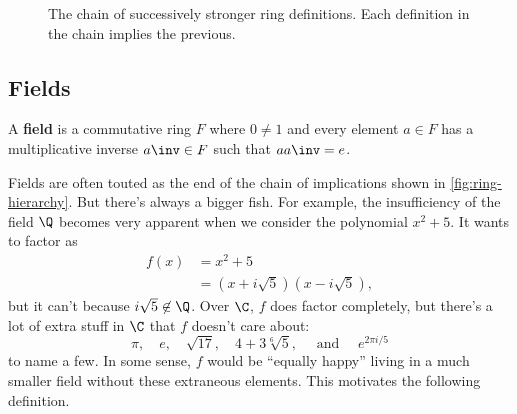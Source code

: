 \begin{figure}
    \centering
    \caption{The chain of successively stronger ring definitions. Each definition in the chain implies the previous.}
    \label{fig:ring-hierarchy}
\end{figure}

\subsection{Fields}

\begin{definition}[Field]
    A \textbf{field} is a commutative ring $F$ where $0 \neq 1$ and every element $a \in F$ has a multiplicative inverse $a \inv \in F$ such that $a a \inv = e$.
\end{definition}

Fields are often touted as the end of the chain of implications shown in \autoref{fig:ring-hierarchy}. But there's always a bigger fish. For example, the insufficiency of the field $\Q$ becomes very apparent when we consider the polynomial $x^2 + 5$. It wants to factor as
\begin{equation}
    \begin{aligned}
        f(x) & = x^2 + 5                         \\
             & = (x + i \sqrt 5)(x - i \sqrt 5),
    \end{aligned}
\end{equation}
but it can't because $i \sqrt 5 \not \in \Q$. Over $\C$, $f$ does factor completely, but there's a lot of extra stuff in $\C$ that $f$ doesn't care about:
\begin{equation}
    \pi, \quad
    e, \quad
    \sqrt{17}, \quad
    4 + 3 \sqrt[6]{5}, \quad \text{ and } \quad
    e^{2 \pi i / 5}
\end{equation}
to name a few.
In some sense, $f$ would be ``equally happy'' living in a much smaller field without these extraneous elements. This motivates the following definition.


